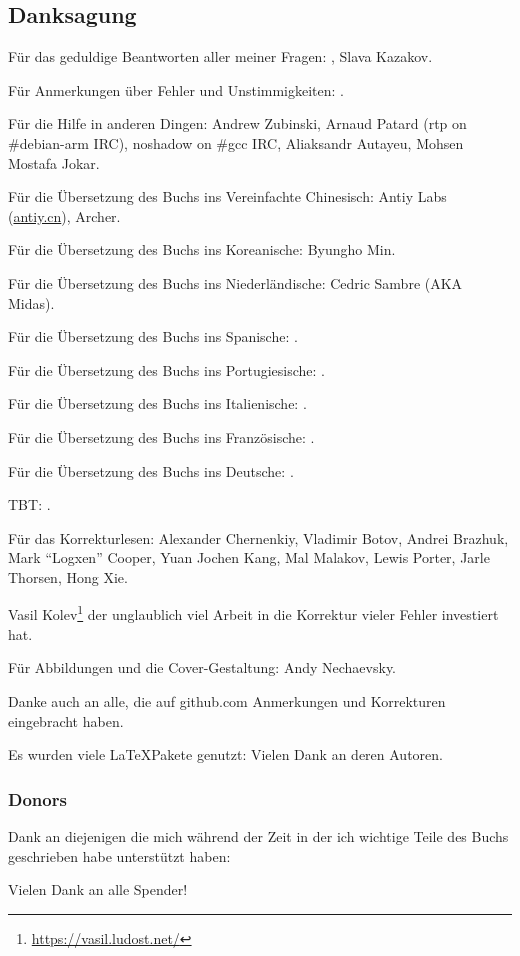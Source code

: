 \subsection*{Danksagung}

Für das geduldige Beantworten aller meiner Fragen: \HERMIT, Slava  Kazakov.

Für Anmerkungen über Fehler und Unstimmigkeiten: \PeopleMistakesInaccuracies{}.

Für die Hilfe in anderen Dingen:
Andrew Zubinski,
Arnaud Patard (rtp on \#debian-arm IRC),
noshadow on \#gcc IRC,
Aliaksandr Autayeu,
Mohsen Mostafa Jokar.

Für die Übersetzung des Buchs ins Vereinfachte Chinesisch:
Antiy Labs (\href{http://antiy.cn}{antiy.cn}), Archer.

Für die Übersetzung des Buchs ins Koreanische: Byungho Min.

Für die Übersetzung des Buchs ins Niederländische: Cedric Sambre (AKA Midas).

Für die Übersetzung des Buchs ins Spanische: \PeopleSpanishTranslators{}.

Für die Übersetzung des Buchs ins Portugiesische: \PeoplePTBRTranslators{}.

Für die Übersetzung des Buchs ins Italienische: \PeopleItalianTranslators{}.

Für die Übersetzung des Buchs ins Französische: \PeopleFrenchTranslators{}.

Für die Übersetzung des Buchs ins Deutsche: \PeopleGermanTranslators{}.

\ac{TBT}: \PeoplePolishTranslators{}.

Für das Korrekturlesen:
Alexander  Chernenkiy,
Vladimir Botov,
Andrei Brazhuk,
Mark ``Logxen'' Cooper, Yuan Jochen Kang, Mal Malakov, Lewis Porter, Jarle Thorsen, Hong Xie.

Vasil Kolev\footnote{\url{https://vasil.ludost.net/}} der unglaublich viel Arbeit in die Korrektur vieler Fehler investiert hat.

Für Abbildungen und die Cover-Gestaltung: Andy Nechaevsky.

Danke auch an alle, die auf github.com Anmerkungen und Korrekturen eingebracht haben\FNGithubContributors{}.

Es wurden viele \LaTeX\-Pakete genutzt: Vielen Dank an deren Autoren.

\subsubsection*{Donors}

Dank an diejenigen die mich während der Zeit in der ich wichtige Teile des Buchs geschrieben habe
unterstützt haben:



Vielen Dank an alle Spender!
